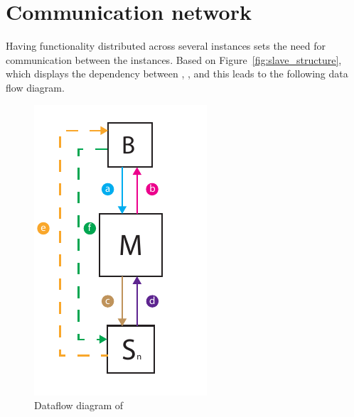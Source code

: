 \section{Communication network}

Having functionality distributed across several instances sets the need for communication between the instances.
Based on Figure~\ref{fig:slave_structure}, which displays the dependency between , , and  this leads to the following data flow diagram. \\


\begin{figure}[!h]
    \centering 
    \includegraphics[width=\textwidth]{gfx/dataflow_diagram.pdf}
    \caption{Dataflow diagram of \projectname{}}
    \label{fig:dataflow_diagrem}
\end{figure}


